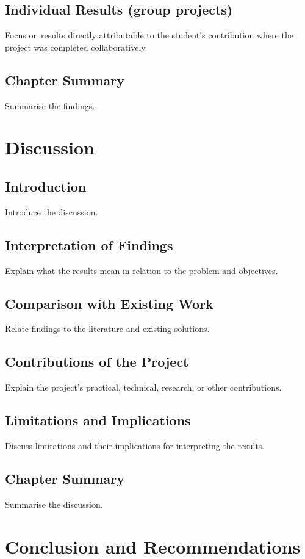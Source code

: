 \documentclass[12pt,a4paper]{report}
\begin{document}
\section{Individual Results (group projects)}
Focus on results directly attributable to the student's contribution where the project was completed collaboratively.

\section{Chapter Summary}
Summarise the findings.

\chapter{Discussion}

\section{Introduction}
Introduce the discussion.

\section{Interpretation of Findings}
Explain what the results mean in relation to the problem and objectives.

\section{Comparison with Existing Work}
Relate findings to the literature and existing solutions.

\section{Contributions of the Project}
Explain the project's practical, technical, research, or other contributions.

\section{Limitations and Implications}
Discuss limitations and their implications for interpreting the results.

\section{Chapter Summary}
Summarise the discussion.

\chapter{Conclusion and Recommendations}
\end{document}
